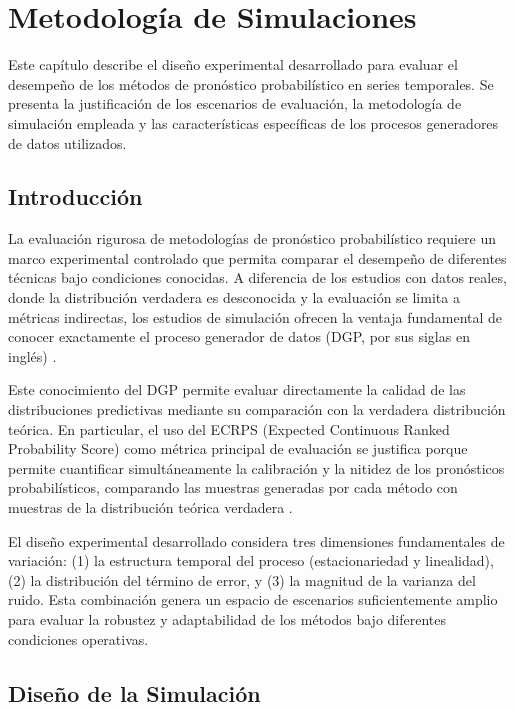\chapter{Metodología de Simulaciones}
\label{cap:diseño_simulacion}

Este capítulo describe el diseño experimental desarrollado para evaluar el desempeño de los métodos de pronóstico probabilístico en series temporales. Se presenta la justificación de los escenarios de evaluación, la metodología de simulación empleada y las características específicas de los procesos generadores de datos utilizados.

\section{Introducción}
\label{sec:intro_simulacion}

La evaluación rigurosa de metodologías de pronóstico probabilístico requiere un marco experimental controlado que permita comparar el desempeño de diferentes técnicas bajo condiciones conocidas. A diferencia de los estudios con datos reales, donde la distribución verdadera es desconocida y la evaluación se limita a métricas indirectas, los estudios de simulación ofrecen la ventaja fundamental de conocer exactamente el proceso generador de datos (DGP, por sus siglas en inglés) \parencite{Hyndman2021FPP3}.

Este conocimiento del DGP permite evaluar directamente la calidad de las distribuciones predictivas mediante su comparación con la verdadera distribución teórica. En particular, el uso del ECRPS (Expected Continuous Ranked Probability Score) como métrica principal de evaluación se justifica porque permite cuantificar simultáneamente la calibración y la nitidez de los pronósticos probabilísticos, comparando las muestras generadas por cada método con muestras de la distribución teórica verdadera \parencite{Gneiting2014}.

El diseño experimental desarrollado considera tres dimensiones fundamentales de variación: (1) la estructura temporal del proceso (estacionariedad y linealidad), (2) la distribución del término de error, y (3) la magnitud de la varianza del ruido. Esta combinación genera un espacio de escenarios suficientemente amplio para evaluar la robustez y adaptabilidad de los métodos bajo diferentes condiciones operativas.

\section{Diseño de la Simulación}
\label{sec:diseño_experimental}

